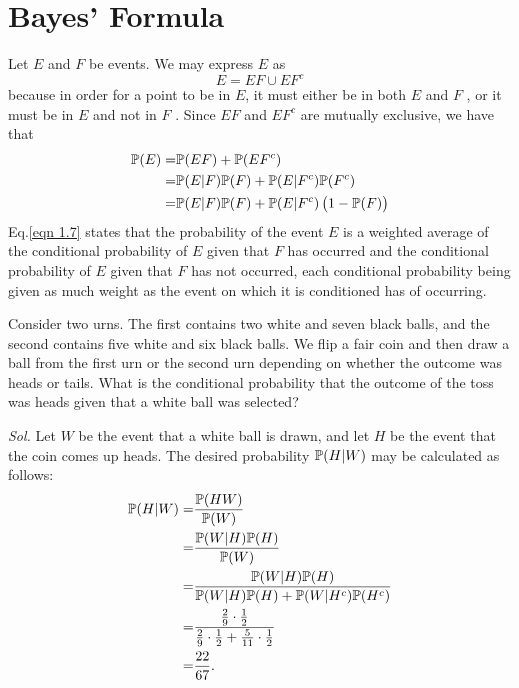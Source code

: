 \section{Bayes' Formula}

Let $E$ and $F$ be events. We may express $E$ as 
\begin{equation*}
    E = EF \cup EF^c
\end{equation*}
because in order for a point to be in $E$, it must either be in both $E$ and $F$ , or it must be in $E$ and not in $F$ . Since $EF$ and $EF^c$ are mutually exclusive, we have that
\begin{align}
    \mathbb{P} (E) = & \mathbb{P} (EF) + \mathbb{P} (EF^c) \notag \\ 
    = & \mathbb{P}(E | F) \mathbb{P}(F) + \mathbb{P} (E | F^c) \mathbb{P}(F^c) \notag \\ 
    = & \mathbb{P}(E | F) \mathbb{P}(F) + \mathbb{P} (E | F^c) \left ( 1 - \mathbb{P}(F) \right) \label{eqn 1.7}
\end{align}
Eq.\eqref{eqn 1.7} states that the probability of the event $E$ is a weighted average of the conditional probability of $E$ given that $F$ has occurred and the conditional probability of $E$ given that $F$ has not occurred, each conditional probability being given as much weight as the event on which it is conditioned has of occurring.

\begin{example}
    Consider two urns. The first contains two white and seven black balls,
    and the second contains five white and six black balls. We flip a fair coin and then draw a ball from the first urn or the second urn depending on whether the outcome was heads or tails. What is the conditional probability that the outcome of the toss was heads given that a white ball was selected?

    \textit{ Sol. } Let $W$ be the event that a white ball is drawn, and let $H$ be the event that the coin comes up heads. The desired probability $\mathbb{P} (H |W)$ may be calculated as follows:
    \begin{align*}
        \mathbb{P} (H | W) = & \frac{\mathbb{P} (HW)}{\mathbb{P} (W)} \\ 
        = & \frac{\mathbb{P} (W | H) \mathbb{P} (H)}{\mathbb{P} (W)} \\ 
        = & \frac{\mathbb{P} (W | H) \mathbb{P} (H)}{\mathbb{P} (W | H) \mathbb{P} (H) + \mathbb{P} (W | H^c) \mathbb{P} (H^c)} \\ 
        = & \frac{\frac{2}{9} \cdot \frac{1}{2}}{\frac{2}{9} \cdot \frac{1}{2} + \frac{5}{11} \cdot \frac{1}{2}} \\ 
        = & \frac{22}{67}.
    \end{align*}
\end{example}

